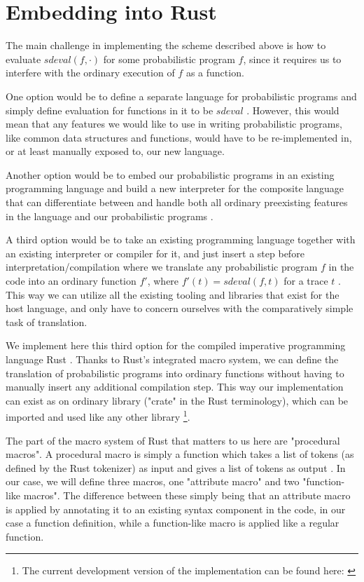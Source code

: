 \section{Embedding into Rust}

The main challenge in implementing the scheme described above is how to evaluate $sdeval(f, \cdot)$ for some probabilistic program $f$, since it requires us to interfere with the ordinary execution of $f$ as a function.

One option would be to define a separate language for probabilistic programs and simply define evaluation for functions in it to be $sdeval$ \cite{carpenter2017stan}. However, this would mean that any features we would like to use in writing probabilistic programs, like common data structures and functions, would have to be re-implemented in, or at least manually exposed to, our new language.

Another option would be to embed our probabilistic programs in an existing programming language and build a new interpreter for the composite language that can differentiate between and handle both all ordinary preexisting features in the language and our probabilistic programs \cite{goodman2012church}.

A third option would be to take an existing programming language together with an existing interpreter or compiler for it, and just insert a step before interpretation/compilation where we translate any probabilistic program $f$ in the code into an ordinary function $f'$, where $f'(t) = sdeval(f,t)$ for a trace $t$ \cite{wingate2011lightweight} \cite{cusumano2019gen}. This way we can utilize all the existing tooling and libraries that exist for the host language, and only have to concern ourselves with the comparatively simple task of translation.

We implement here this third option for the compiled imperative programming language Rust \cite{RustProg37:online}. Thanks to Rust's integrated macro system, we can define the translation of probabilistic programs into ordinary functions without having to manually insert any additional compilation step. This way our implementation can exist as on ordinary library ("crate" in the Rust terminology), which can be imported and used like any other library \footnote{The current development version of the implementation can be found here: \cite{GitHubGa46:online}}.

The part of the macro system of Rust that matters to us here are "procedural macros". A procedural macro is simply a function which takes a list of tokens (as defined by the Rust tokenizer) as input and gives a list of tokens as output \cite{Procedur10:online}. In our case, we will define three macros, one "attribute macro" and two "function-like macros". The difference between these simply being that an attribute macro is applied by annotating it to an existing syntax component in the code, in our case a function definition, while a function-like macro is applied like a regular function.

